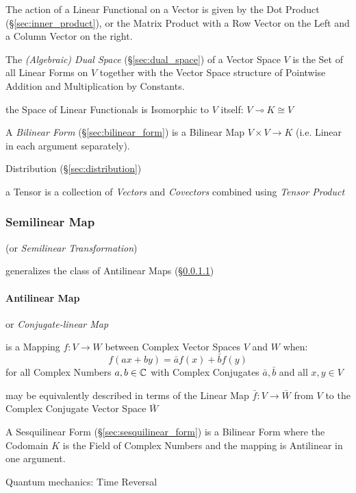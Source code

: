 The action of a Linear Functional on a Vector is given by the Dot Product
(\S\ref{sec:inner_product}), or the Matrix Product with a Row Vector on the
Left and a Column Vector on the right.

The \emph{(Algebraic) Dual Space} (\S\ref{sec:dual_space}) of a Vector Space
$V$ is the Set of all Linear Forms on $V$ together with the Vector Space
structure of Pointwise Addition and Multiplication by Constants.

the Space of Linear Functionals is Isomorphic to $V$ itself:
$V \multimap K \cong V$

A \emph{Bilinear Form} (\S\ref{sec:bilinear_form}) is a Bilinear Map $V \times
V \rightarrow K$ (i.e. Linear in each argument separately).

Distribution (\S\ref{sec:distribution})

\fist a Tensor is a collection of \emph{Vectors} and \emph{Covectors} combined
using \emph{Tensor Product}



\subsubsection{Semilinear Map}\label{sec:semilinear_map}

(or \emph{Semilinear Transformation})

generalizes the class of Antilinear Maps (\S\ref{sec:antilinear_map})



\paragraph{Antilinear Map}\label{sec:antilinear_map}\hfill

or \emph{Conjugate-linear Map}

is a Mapping $f : V \rightarrow W$ between Complex Vector Spaces $V$ and $W$
when:
\[
  f (ax+by) = \bar{a}f(x) + \bar{b}f(y)
\]
for all Complex Numbers $a,b \in \mathbb{C}$ with Complex Conjugates $\bar{a},
\bar{b}$ and all $x,y \in V$

may be equivalently described in terms of the Linear Map $\bar{f} : V
\rightarrow \bar{W}$ from $V$ to the Complex Conjugate Vector Space $\bar{W}$

A Sesquilinear Form (\S\ref{sec:sesquilinear_form}) is a Bilinear Form where
the Codomain $K$ is the Field of Complex Numbers and the mapping is Antilinear
in one argument.


Quantum mechanics: Time Reversal

